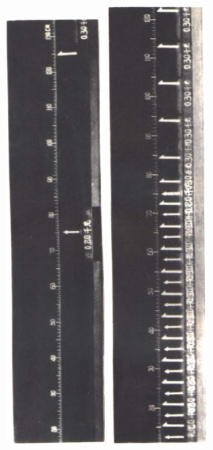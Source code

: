 \begin{figure}[htbp]
\begin{minipage}[t]{0.24\linewidth}
        \caption{}\label{fig_A_8-4}
    \end{minipage}
    \hfill
    \begin{minipage}[t]{0.24\linewidth}
            \centering
        \includegraphics[width=3.3cm]{fig/A/8-5.png}
        \caption{}\label{fig_A_8-5}
    \end{minipage}
    \hfill
    \begin{minipage}[t]{0.24\linewidth}
        \centering
        \includegraphics[width=3.3cm]{fig/A/8-6.png}

\end{minipage}
\end{figure}
